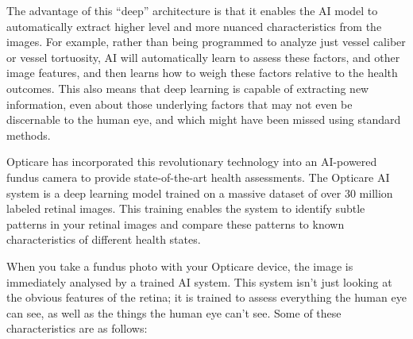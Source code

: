 \documentclass[
  Letterpaper,
]{scrbook}
\begin{document}
The advantage of this ``deep'' architecture is that it enables the AI
model to automatically extract higher level and more nuanced
characteristics from the images. For example, rather than being
programmed to analyze just vessel caliber or vessel tortuosity, AI will
automatically learn to assess these factors, and other image features,
and then learns how to weigh these factors relative to the health
outcomes. This also means that deep learning is capable of extracting
new information, even about those underlying factors that may not even
be discernable to the human eye, and which might have been missed using
standard methods.

Opticare has incorporated this revolutionary technology into an
AI-powered fundus camera to provide state-of-the-art health assessments.
The Opticare AI system is a deep learning model trained on a massive
dataset of over 30 million labeled retinal images. This training enables
the system to identify subtle patterns in your retinal images and
compare these patterns to known characteristics of different health
states.

When you take a fundus photo with your Opticare device, the image is
immediately analysed by a trained AI system. This system isn't just
looking at the obvious features of the retina; it is trained to assess
everything the human eye can see, as well as the things the human eye
can't see. Some of these characteristics are as follows:
\end{document}
